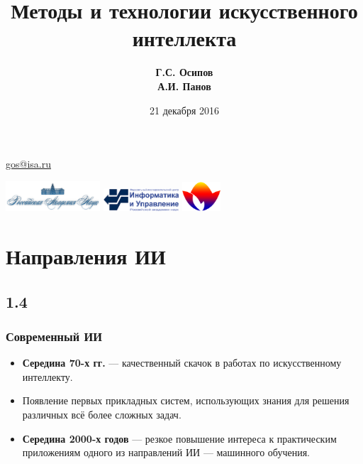 \documentclass[default]{beamer}
\begin{document}
	
	\title[Методы и технологии ИИ]{Методы и технологии искусственного интеллекта}
	\author[Осипов, Панов]{\textbf{Г.С. Осипов\\А.И. Панов}}
	\date{21 декабря 2016} 
	
	{
	\begin{frame}
		
		\titlepage
		\centering
		\href{mailto:gos@isa.ru}{gos@isa.ru}
		
		\includegraphics[width=100pt]{misc/logos/ras.png} \hspace{10pt}
		\includegraphics[width=80pt]{misc/logos/frccsc.png} \hspace{10pt}
		\includegraphics[width=40pt]{misc/logos/raai.png}
	\end{frame}
	}	

	\section{Направления ИИ}
	\subsection{1.4}
	\begin{frame}
		\frametitle{Современный ИИ}
		\Large
		\begin{itemize}
			\item \textbf{Середина 70-х гг.} --- качественный скачок в работах по искусственному интеллекту.
			\item Появление  первых прикладных систем, использующих знания для решения различных всё более сложных задач.
			\item \textbf{Середина 2000-х годов} --- резкое повышение интереса к практическим приложениям одного из направлений ИИ --- машинного обучения.
		\end{itemize}
	\end{frame}
\end{document}
